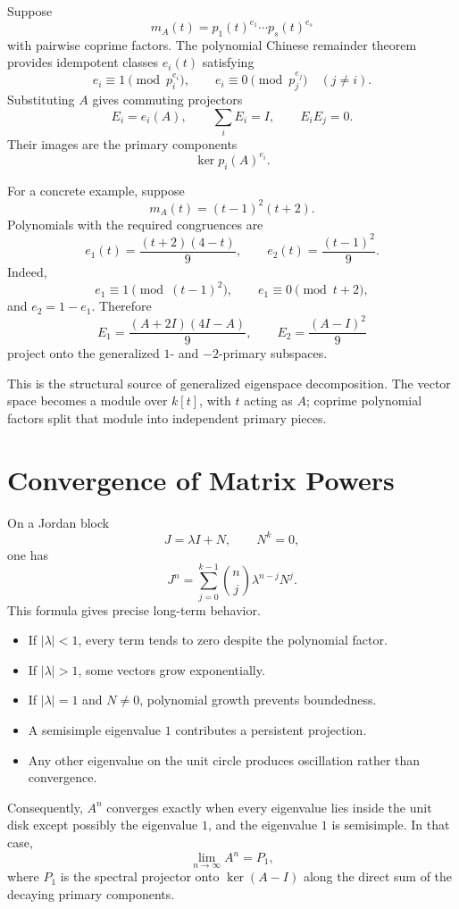 Suppose
\[
  m_A(t)=p_1(t)^{e_1}\cdots p_s(t)^{e_s}
\]
with pairwise coprime factors.  The polynomial Chinese remainder theorem provides idempotent classes \(e_i(t)\) satisfying
\[
  e_i\equiv1\pmod{p_i^{e_i}},
  \qquad
  e_i\equiv0\pmod{p_j^{e_j}}
  \quad(j\ne i).
\]
Substituting \(A\) gives commuting projectors
\[
  E_i=e_i(A),
  \qquad
  \sum_iE_i=I,
  \qquad
  E_iE_j=0.
\]
Their images are the primary components
\[
  \ker p_i(A)^{e_i}.
\]

For a concrete example, suppose
\[
  m_A(t)=(t-1)^2(t+2).
\]
Polynomials with the required congruences are
\[
  e_1(t)=\frac{(t+2)(4-t)}9,
  \qquad
  e_2(t)=\frac{(t-1)^2}{9}.
\]
Indeed,
\[
  e_1\equiv1\pmod{(t-1)^2},
  \qquad
  e_1\equiv0\pmod{t+2},
\]
and \(e_2=1-e_1\).  Therefore
\[
  E_1=\frac{(A+2I)(4I-A)}9,
  \qquad
  E_2=\frac{(A-I)^2}{9}
\]
project onto the generalized \(1\)- and \(-2\)-primary subspaces.

This is the structural source of generalized eigenspace decomposition.  The vector space becomes a module over \(k[t]\), with \(t\) acting as \(A\); coprime polynomial factors split that module into independent primary pieces.

\section{Convergence of Matrix Powers}

On a Jordan block
\[
  J=\lambda I+N,
  \qquad N^k=0,
\]
one has
\[
  J^n
  =\sum_{j=0}^{k-1}
  \binom nj\lambda^{n-j}N^j.
\]
This formula gives precise long-term behavior.

\begin{itemize}
  \item If \(|\lambda|<1\), every term tends to zero despite the polynomial factor.
  \item If \(|\lambda|>1\), some vectors grow exponentially.
  \item If \(|\lambda|=1\) and \(N\ne0\), polynomial growth prevents boundedness.
  \item A semisimple eigenvalue \(1\) contributes a persistent projection.
  \item Any other eigenvalue on the unit circle produces oscillation rather than convergence.
\end{itemize}

Consequently, \(A^n\) converges exactly when every eigenvalue lies inside the unit disk except possibly the eigenvalue \(1\), and the eigenvalue \(1\) is semisimple.  In that case,
\[
  \lim_{n\to\infty}A^n=P_1,
\]
where \(P_1\) is the spectral projector onto \(\ker(A-I)\) along the direct sum of the decaying primary components.

